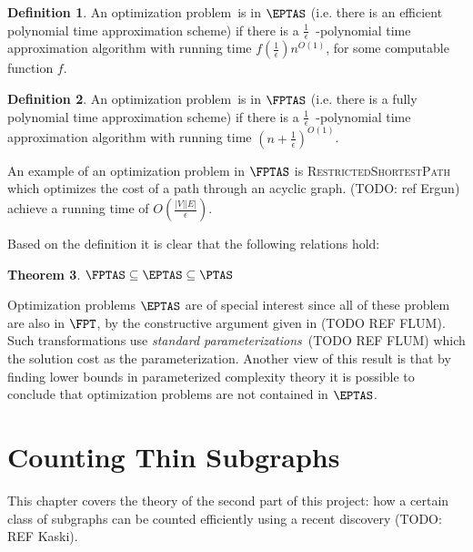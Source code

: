 \documentclass[a4paper,11pt]{report}
\theoremstyle{plain}
\newtheorem{thm}{Theorem}[chapter] %
\theoremstyle{definition}
\newtheorem{defn}[thm]{Definition} %
\begin{document}
\begin{defn}
An optimization problem is in $\EPTAS$ (i.e. there is an efficient polynomial time approximation scheme) if there is a $\frac{1}{\epsilon}$ -polynomial time approximation algorithm with 
running time $f(\frac{1}{\epsilon}) n^{O(1)}$, for some computable function $f$.
\end{defn}

\begin{defn}
An optimization problem is in $\FPTAS$ (i.e. there is a fully polynomial time approximation scheme) if there is a $\frac{1}{\epsilon}$ -polynomial time approximation algorithm with 
running time $(n + \frac{1}{\epsilon})^{O(1)}$.
\end{defn}

An example of an optimization problem in $\FPTAS$ is \textsc{RestrictedShortestPath} which optimizes the cost of a path through an acyclic graph.
(TODO: ref Ergun) achieve a running time of $O(\frac{|V| |E|}{\epsilon})$.

Based on the definition it is clear that the following relations hold:

\begin{thm}
$\FPTAS \subseteq \EPTAS \subseteq \PTAS$
\end{thm}

Optimization problems $\EPTAS$ are of special interest since all of these problem are also in $\FPT$, by the constructive argument given in (TODO REF FLUM).
Such transformations use \emph{standard parameterizations} (TODO REF FLUM) which the solution cost as the parameterization.
Another view of this result is that by finding lower bounds in parameterized complexity theory it is possible to conclude that optimization problems are not contained in $\EPTAS$.


\chapter{Counting Thin Subgraphs}
This chapter covers the theory of the second part of this project: how a certain class of subgraphs can be counted efficiently using a recent discovery (TODO: REF Kaski).
\end{document}
